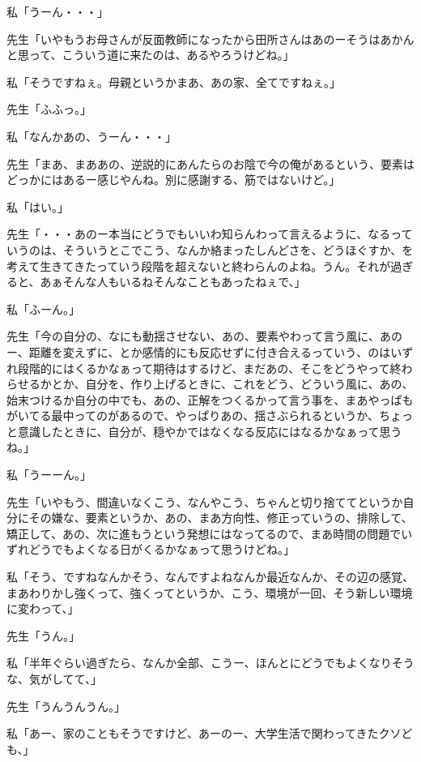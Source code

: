 \documentclass[b5j,twoside,twocolumn]{utarticle}
\begin{document}
\begin{description}
\item 私「うーん・・・」
\item 先生「いやもうお母さんが反面教師になったから田所さんはあのーそうはあかんと思って、こういう道に来たのは、あるやろうけどね。」
\item 私「そうですねぇ。母親というかまあ、あの家、全てですねぇ。」
\item 先生「ふふっ。」
\item 私「なんかあの、うーん・・・」
\item 先生「まあ、まああの、逆説的にあんたらのお陰で今の俺があるという、要素はどっかにはあるー感じやんね。別に感謝する、筋ではないけど。」
\item 私「はい。」
\item 先生「・・・あのー本当にどうでもいいわ知らんわって言えるように、なるっていうのは、そういうとこでこう、なんか絡まったしんどさを、どうほぐすか、を考えて生きてきたっていう段階を超えないと終わらんのよね。うん。それが過ぎると、あぁそんな人もいるねそんなこともあったねぇで、」
\item 私「ふーん。」
\item 先生「今の自分の、なにも動揺させない、あの、要素やわって言う風に、あのー、距離を変えずに、とか感情的にも反応せずに付き合えるっていう、のはいずれ段階的にはくるかなぁって期待はするけど、まだあの、そこをどうやって終わらせるかとか、自分を、作り上げるときに、これをどう、どういう風に、あの、始末つけるか自分の中でも、あの、正解をつくるかって言う事を、まあやっぱもがいてる最中ってのがあるので、やっぱりあの、揺さぶられるというか、ちょっと意識したときに、自分が、穏やかではなくなる反応にはなるかなぁって思うね。」
\item 私「うーーん。」
\item 先生「いやもう、間違いなくこう、なんやこう、ちゃんと切り捨ててというか自分にその嫌な、要素というか、あの、まあ方向性、修正っていうの、排除して、矯正して、あの、次に進もうという発想にはなってるので、まあ時間の問題でいずれどうでもよくなる日がくるかなぁって思うけどね。」
\item 私「そう、ですねなんかそう、なんですよねなんか最近なんか、その辺の感覚、まあわりかし強くって、強くってというか、こう、環境が一回、そう新しい環境に変わって、」
\item 先生「うん。」
\item 私「半年ぐらい過ぎたら、なんか全部、こうー、ほんとにどうでもよくなりそうな、気がしてて、」
\item 先生「うんうんうん。」
\item 私「あー、家のこともそうですけど、あーのー、大学生活で関わってきたクソども、」

\end{description}
\end{document}

